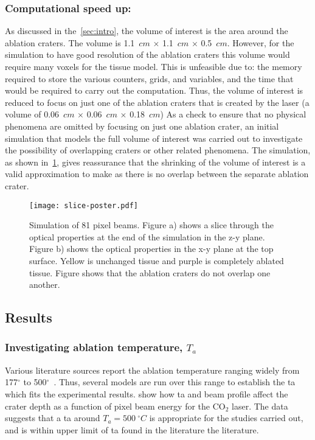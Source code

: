 \subsubsection*{Computational speed up:}
As discussed in the~\cref{sec:intro}, the volume of interest is the area around the ablation craters. The volume is 1.1~$cm$ $\times$ 1.1~$cm$ $\times$ 0.5~$cm$. However, for the simulation to have good resolution of the ablation craters this volume would require many voxels for the tissue model. This is unfeasible due to: the memory required to store the various counters, grids, and variables, and the time that would be required to carry out the computation. Thus, the volume of interest is reduced to focus on just one of the ablation craters that is created by the laser (a volume of  0.06~$cm$ $\times$ 0.06~$cm$ $\times$ 0.18~$cm$) 
As a check to ensure that no physical phenomena are omitted by focusing on just one ablation crater, an initial simulation that models the full volume of interest was carried out to investigate the possibility of overlapping craters or other related phenomena. The simulation, as shown in~\cref{fig:sizecheck}, gives reassurance that the shrinking of the volume of interest is a valid approximation to make as there is no overlap between the separate ablation crater.
\begin{figure}[!htbp]
	\centering
    \texttt{[image: slice-poster.pdf]}
    \caption{Simulation of 81 pixel beams. Figure a) shows a slice through the optical properties at the end of the simulation in the z-y plane. Figure b) shows the optical properties in the x-y plane at the top surface. Yellow is unchanged tissue and purple is completely ablated tissue. Figure shows that the ablation craters do not overlap one another.}
    \label{fig:sizecheck}
\end{figure}


\subsection{Results}

\subsubsection*{Investigating ablation temperature, \texorpdfstring{$T_a$}{Ta}}

Various literature sources report the ablation temperature ranging widely from 177$^{\circ}$ to 500$^{\circ}$~\cite{gerstmann1994char,mckenzie1986three,sagi1992heating}. Thus, several models are run over this range to establish the \gls*{ta} which fits the experimental results.  show how \gls*{ta} and beam profile affect the crater depth as a function of pixel beam energy for the CO$_2$ laser. The data suggests that a \gls*{ta} around $T_a=500~^{\circ}C$ is appropriate for the studies carried out, and is within upper limit of \gls*{ta} found in the literature the literature.

